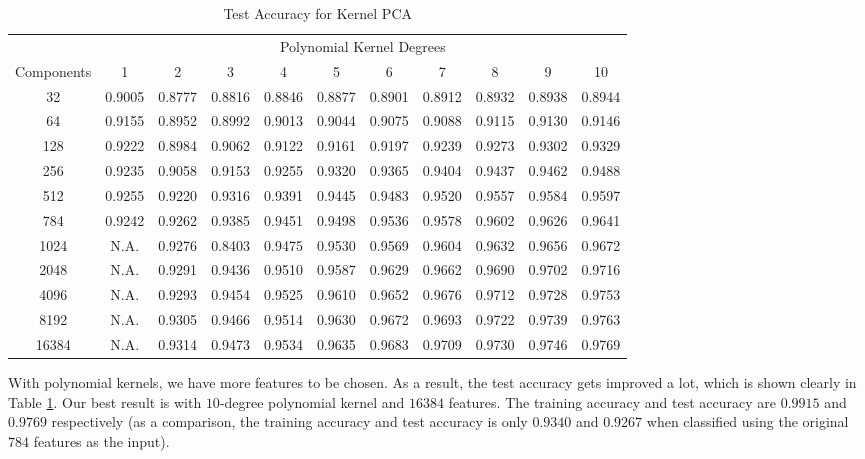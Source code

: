 \documentclass[tikz, multi,dvipsnames,svgnames,x11names]{article}
\begin{document}
\begin{table}[htb]
	\centering
	\caption{Test Accuracy for Kernel PCA}
	\label{table:test_acc}	
	\begin{tabular}{c c c c c c c c c c c}
		\hline \hline
			   & \multicolumn{10}{c}{Polynomial Kernel Degrees} \\
		\cline{2-11}
    Components & 1 	 	& 2 	 &	3 	   & 4 		& 5 	 & 6 	  & 7 	   & 8 	    & 9 	 & 10 \\[0.1cm]
		\hline
		32	   & 0.9005 & 0.8777 &	0.8816 & 0.8846 & 0.8877 & 0.8901 & 0.8912 & 0.8932 & 0.8938 & 0.8944\\[0.1cm]
		64	   & 0.9155 & 0.8952 &	0.8992 & 0.9013 & 0.9044 & 0.9075 & 0.9088 & 0.9115 & 0.9130 & 0.9146\\[0.1cm]
		128	   & 0.9222 & 0.8984 &	0.9062 & 0.9122 & 0.9161 & 0.9197 & 0.9239 & 0.9273 & 0.9302 & 0.9329\\[0.1cm]
		256    & 0.9235 & 0.9058 &	0.9153 & 0.9255 & 0.9320 & 0.9365 & 0.9404 & 0.9437 & 0.9462 & 0.9488\\[0.1cm]
		512	   & 0.9255 & 0.9220 &	0.9316 & 0.9391 & 0.9445 & 0.9483 & 0.9520 & 0.9557 & 0.9584 & 0.9597\\[0.1cm]
		784	   & 0.9242 & 0.9262 &	0.9385 & 0.9451 & 0.9498 & 0.9536 & 0.9578 & 0.9602 & 0.9626 & 0.9641\\[0.1cm]
		1024   & N.A.	& 0.9276 &	0.8403 & 0.9475 & 0.9530 & 0.9569 & 0.9604 & 0.9632 & 0.9656 & 0.9672\\[0.1cm]
		2048   & N.A.	& 0.9291 &	0.9436 & 0.9510 & 0.9587 & 0.9629 & 0.9662 & 0.9690 & 0.9702 & 0.9716\\[0.1cm]
		4096   & N.A.	& 0.9293 &	0.9454 & 0.9525 & 0.9610 & 0.9652 & 0.9676 & 0.9712 & 0.9728 & 0.9753\\[0.1cm]
		8192   & N.A.	& 0.9305 &	0.9466 & 0.9514 & 0.9630 & 0.9672 & 0.9693 & 0.9722 & 0.9739 & 0.9763\\[0.1cm]
		16384  & N.A.	& 0.9314 &	0.9473 & 0.9534 & 0.9635 & 0.9683 & 0.9709 & 0.9730 & 0.9746 & 0.9769\\[0.1cm]
		\hline	
	\end{tabular}
\end{table}

With polynomial kernels, we have more features to be chosen. As a result, the test accuracy gets improved a lot, which is shown clearly in Table \ref{table:test_acc}. Our best result is with $10$-degree polynomial kernel and $16384$ features. The training accuracy and test accuracy are $0.9915$ and $0.9769$ respectively (as a comparison, the training accuracy and test accuracy is only $0.9340$ and $0.9267$ when classified using the original $784$ features as the input).
\end{document}
